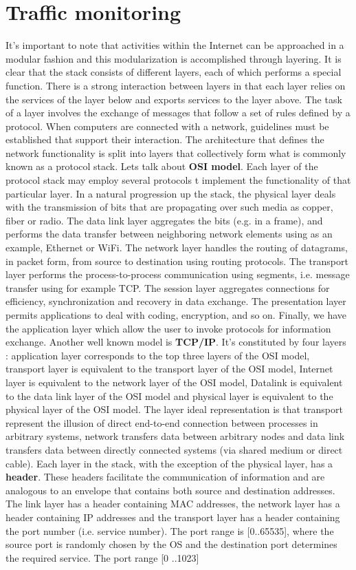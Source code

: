 \documentclass[11pt]{article}
\begin{document}
\section{Traffic monitoring}
It's important to note that activities within the Internet can be approached in a modular fashion and this modularization is accomplished through layering. It is clear that the stack consists of different layers, each of which performs a special function. There is a strong interaction between layers in that each layer relies on the services of the layer below and exports services to the layer above. The task
of a layer involves the exchange of messages that follow a set of rules defined by a protocol. When computers are connected with a network, guidelines must be established that support their interaction. The architecture that defines the network functionality is split into layers that collectively form what is commonly known as a protocol stack. Lets talk about \textbf{OSI model}. Each layer of the protocol stack may employ several protocols t implement the functionality of that particular layer. In a natural progression up the stack, the physical layer deals with the transmission of bits that are propagating over such media as copper, fiber or radio. The data link layer aggregates the bits (e.g. in a frame), and performs the data transfer between neighboring network elements using as an example, Ethernet or WiFi. The network layer handles the routing of datagrams, in packet form, from source to destination using routing protocols. The transport layer performs the process-to-process communication using segments, i.e. message transfer using for example TCP. The session layer aggregates connections for efficiency, synchronization and recovery in data exchange. The presentation layer permits applications to deal with coding, encryption, and so on. Finally, we have the application layer which allow the user to invoke protocols for information exchange. Another well known model is \textbf{TCP/IP}. It's constituted by four layers : application layer  corresponds to the top three layers of the OSI model, transport layer is equivalent to the transport layer of the OSI model, Internet layer is equivalent to the network layer of the OSI model, Datalink is equivalent to the data link layer of the OSI model and physical layer is equivalent to the physical layer of the OSI model. The layer ideal representation is that transport represent the illusion of direct end-to-end connection between processes in arbitrary systems, network transfers data between arbitrary nodes and data link transfers data between directly connected systems (via shared medium or direct cable). Each layer in the stack, with the exception of the physical layer, has a \textbf{header}. These headers facilitate the communication of information and are analogous to an envelope that contains both source and destination addresses. The link layer has a header containing MAC addresses, the network layer has a header containing IP addresses and the transport layer has a header containing the port  number (i.e. service number). The port range is [0..65535], where the source port is randomly chosen by the OS and the destination port determines the required service. The port range [0 ..1023] 
\end{document}
